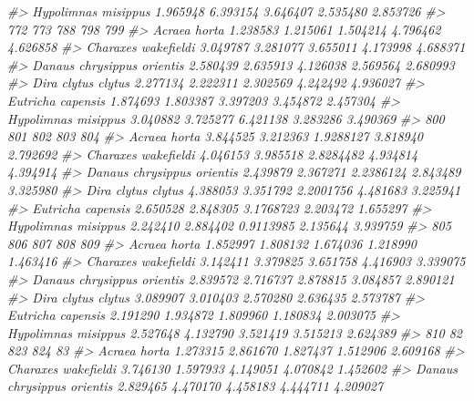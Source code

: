 \documentclass[
]{article}
\newenvironment{Shaded}{\begin{snugshade}}{\end{snugshade}}
\newcommand{\CommentTok}[1]{\textcolor[rgb]{0.56,0.35,0.01}{\textit{#1}}}
\begin{document}
\begin{Shaded}
\begin{Highlighting}[]
\CommentTok{\#\textgreater{} Hypolimnas misippus        1.965948 6.393154 3.646407 2.535480 2.853726}
\CommentTok{\#\textgreater{}                                 772      773      788      798      799}
\CommentTok{\#\textgreater{} Acraea horta               1.238583 1.215061 1.504214 4.796462 4.626858}
\CommentTok{\#\textgreater{} Charaxes wakefieldi        3.049787 3.281077 3.655011 4.173998 4.688371}
\CommentTok{\#\textgreater{} Danaus chrysippus orientis 2.580439 2.635913 4.126038 2.569564 2.680993}
\CommentTok{\#\textgreater{} Dira clytus clytus         2.277134 2.222311 2.302569 4.242492 4.936027}
\CommentTok{\#\textgreater{} Eutricha capensis          1.874693 1.803387 3.397203 3.454872 2.457304}
\CommentTok{\#\textgreater{} Hypolimnas misippus        3.040882 3.725277 6.421138 3.283286 3.490369}
\CommentTok{\#\textgreater{}                                 800      801       802      803      804}
\CommentTok{\#\textgreater{} Acraea horta               3.844525 3.212363 1.9288127 3.818940 2.792692}
\CommentTok{\#\textgreater{} Charaxes wakefieldi        4.046153 3.985518 2.8284482 4.934814 4.394914}
\CommentTok{\#\textgreater{} Danaus chrysippus orientis 2.439879 2.367271 2.2386124 2.843489 3.325980}
\CommentTok{\#\textgreater{} Dira clytus clytus         4.388053 3.351792 2.2001756 4.481683 3.225941}
\CommentTok{\#\textgreater{} Eutricha capensis          2.650528 2.848305 3.1768723 2.203472 1.655297}
\CommentTok{\#\textgreater{} Hypolimnas misippus        2.242410 2.884402 0.9113985 2.135644 3.939759}
\CommentTok{\#\textgreater{}                                 805      806      807      808      809}
\CommentTok{\#\textgreater{} Acraea horta               1.852997 1.808132 1.674036 1.218990 1.463416}
\CommentTok{\#\textgreater{} Charaxes wakefieldi        3.142411 3.379825 3.651758 4.416903 3.339075}
\CommentTok{\#\textgreater{} Danaus chrysippus orientis 2.839572 2.716737 2.878815 3.084857 2.890121}
\CommentTok{\#\textgreater{} Dira clytus clytus         3.089907 3.010403 2.570280 2.636435 2.573787}
\CommentTok{\#\textgreater{} Eutricha capensis          2.191290 1.934872 1.809960 1.180834 2.003075}
\CommentTok{\#\textgreater{} Hypolimnas misippus        2.527648 4.132790 3.521419 3.515213 2.624389}
\CommentTok{\#\textgreater{}                                 810        82      823      824        83}
\CommentTok{\#\textgreater{} Acraea horta               1.273315  2.861670 1.827437 1.512906  2.609168}
\CommentTok{\#\textgreater{} Charaxes wakefieldi        3.746130  1.597933 4.149051 4.070842  1.452602}
\CommentTok{\#\textgreater{} Danaus chrysippus orientis 2.829465  4.470170 4.458183 4.444711  4.209027}

\end{Highlighting}
\end{Shaded}
\end{document}
